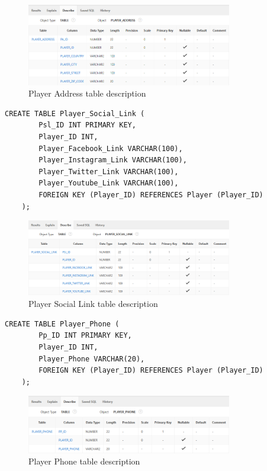 \begin{figure}[H]
    \centering
    \includegraphics[width=0.8\textwidth]{images/TableDesc/PLAYER_ADDRESS.png}
    \caption{Player Address table description}
    \label{fig:player_address_table}
\end{figure}
\begin{lstlisting}[caption={Create Player Social Link table}, label={lst:create_player_social_link}]
    CREATE TABLE Player_Social_Link (
        Psl_ID INT PRIMARY KEY,
        Player_ID INT,
        Player_Facebook_Link VARCHAR(100),
        Player_Instagram_Link VARCHAR(100),
        Player_Twitter_Link VARCHAR(100),
        Player_Youtube_Link VARCHAR(100),
        FOREIGN KEY (Player_ID) REFERENCES Player (Player_ID)
    );
    \end{lstlisting}
\begin{figure}[H]
    \centering
    \includegraphics[width=0.8\textwidth]{images/TableDesc/PLAYER_SOCIAL_LINK.png}
    \caption{Player Social Link table description}
    \label{fig:player_social_link_table}
\end{figure}
\clearpage
\begin{lstlisting}[caption={Create Player Phone table}, label={lst:create_player_phone}]
    CREATE TABLE Player_Phone (
        Pp_ID INT PRIMARY KEY,
        Player_ID INT,
        Player_Phone VARCHAR(20),
        FOREIGN KEY (Player_ID) REFERENCES Player (Player_ID)
    );
    \end{lstlisting}
\begin{figure}[H]
    \centering
    \includegraphics[width=0.8\textwidth]{images/TableDesc/PLAYER_PHONE.png}
    \caption{Player Phone table description}
    \label{fig:player_phone_table}
\end{figure}
